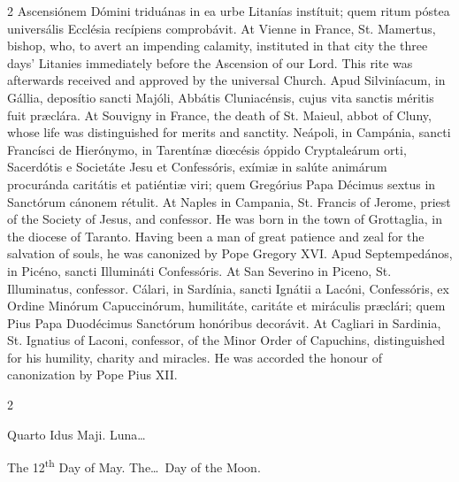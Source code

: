 \begin{paracol}{2}
 Ascensiónem Dómini triduánas in ea urbe Litanías instítuit; quem ritum 
 póstea universális Ecclésia recípiens comprobávit.
\switchcolumn
{}
At Vienne in France, St. Mamertus, 
 bishop, who, to avert an impending calamity, instituted in that city the 
 three days' Litanies immediately before the Ascension of our Lord. 
 This rite was afterwards received and approved by the universal Church.
\switchcolumn*
{}
Apud Silviníacum, in 
 Gállia, deposítio sancti Majóli, Abbátis Cluniacénsis, cujus vita sanctis 
 méritis fuit præclára.
\switchcolumn
{}
At Souvigny in France, the death of 
 St. Maieul, abbot of Cluny, whose life was distinguished for merits and 
 sanctity.
\switchcolumn*
{}
Neápoli, in Campánia, 
 sancti Francísci de Hierónymo, in Tarentínæ diœcésis 
 óppido Cryptaleárum 
 orti, Sacerdótis e Societáte Jesu et Confessóris, exímiæ in salúte animárum 
 procuránda caritátis et patiéntiæ viri; quem Gregórius Papa Décimus sextus 
 in Sanctórum cánonem rétulit.
\switchcolumn
{}
At Naples in Campania, St. Francis 
 of Jerome, priest of the Society of Jesus, and confessor. He was born 
 in the town of Grottaglia, in the diocese of Taranto. Having been a 
 man of great patience and zeal for the salvation of souls, he was canonized 
 by Pope Gregory XVI.
\switchcolumn*
{}
Apud Septempedános, in 
 Picéno, sancti Illumináti Confessóris.
\switchcolumn
{}
At San Severino in Piceno, St. 
 Illuminatus, confessor.
\switchcolumn*
{}
Cálari, in Sardínia, sancti Ignátii a Lacóni, Confessóris, ex Ordine Minórum Capuccinórum, 
 humilitáte, caritáte et miráculis præclári; quem Pius Papa Duodécimus 
 Sanctórum honóribus decorávit.
\switchcolumn
{}
At Cagliari in Sardinia, St. 
 Ignatius of Laconi, confessor, of the Minor Order of Capuchins, 
 distinguished for his humility, charity and miracles. He was accorded 
 the honour of canonization by Pope Pius XII.
\switchcolumn*
{}
\end{paracol}


\begin{paracol}{2}
\begin{center}{\color{gregoriocolor} Quarto Idus Maji. 
 Luna\dots\ }\end{center}
\switchcolumn
{}
\begin{center}{\color{gregoriocolor} The 
 12\textsuperscript{th} Day of May. The\dots\ Day of the Moon.}\end{center}
\end{paracol}

